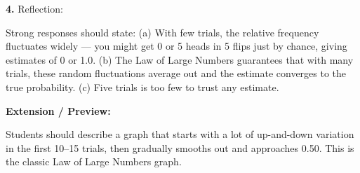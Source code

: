 \documentclass[10pt]{article}
\begin{document}
\begin{practicebox}
\vspace{6pt}
\textbf{4.} Reflection:
\begin{teachernote}
Strong responses should state: (a) With few trials, the relative frequency fluctuates widely --- you might get 0 or 5 heads in 5 flips just by chance, giving estimates of 0 or 1.0. (b) The Law of Large Numbers guarantees that with many trials, these random fluctuations average out and the estimate converges to the true probability. (c) Five trials is too few to trust any estimate.
\end{teachernote}

\vspace{6pt}
\textbf{Extension / Preview:}
\begin{teachernote}
Students should describe a graph that starts with a lot of up-and-down variation in the first 10--15 trials, then gradually smooths out and approaches 0.50. This is the classic Law of Large Numbers graph.
\end{teachernote}

\end{practicebox}
\end{document}
